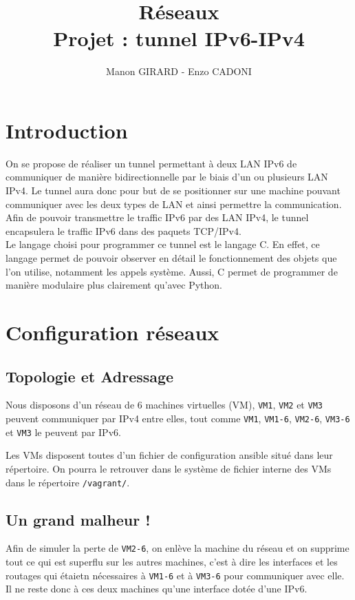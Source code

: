 \documentclass[a4paper, 10pt]{article}
\title{Réseaux\\Projet : tunnel IPv6-IPv4}
\author{Manon GIRARD - Enzo CADONI}
\date{}
\begin{document}
  \maketitle
  \newpage
  \tableofcontents
  \newpage

  \section*{Introduction}
    On se propose de réaliser un tunnel permettant à deux LAN IPv6 de
    communiquer de manière bidirectionnelle par le biais d'un ou plusieurs LAN
    IPv4. Le tunnel aura donc pour but de se positionner sur une machine pouvant
    communiquer avec les deux types de LAN et ainsi permettre la communication.
    Afin de pouvoir transmettre le traffic IPv6 par des LAN IPv4, le tunnel
    encapsulera le traffic IPv6 dans des paquets TCP/IPv4. \\

    Le langage choisi pour programmer ce tunnel est le langage C. En effet, ce
    langage permet de pouvoir observer en détail le fonctionnement des objets
    que l'on utilise, notamment les appels système. Aussi, C permet de
    programmer de manière modulaire plus clairement qu'avec Python.

  \section{Configuration réseaux}
    \subsection{Topologie et Adressage}
      Nous disposons d'un réseau de 6 machines virtuelles (VM), \verb+VM1+,
      \verb+VM2+ et \verb+VM3+ peuvent communiquer par IPv4 entre elles, tout
      comme \verb+VM1+, \verb+VM1-6+, \verb+VM2-6+, \verb+VM3-6+ et \verb+VM3+
      le peuvent par IPv6.

      Les VMs disposent toutes d'un fichier de configuration ansible situé dans
      leur répertoire. On pourra le retrouver dans le système de fichier interne
      des VMs dans le répertoire \verb+/vagrant/+. \\


    \subsection{Un grand malheur !}
      Afin de simuler la perte de \verb+VM2-6+, on enlève la machine du réseau
      et on supprime tout ce qui est superflu sur les autres machines, c'est à
      dire les interfaces et les routages qui étaietn nécessaires à \verb+VM1-6+
      et à \verb+VM3-6+ pour communiquer avec elle. Il ne reste donc à ces deux
      machines qu'une interface dotée d'une IPv6. \\
\end{document}
